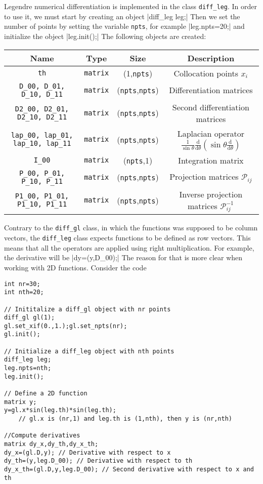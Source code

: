\medskip

Legendre numerical differentiation is implemented in the class \texttt{diff\_leg}. In order to use
it, we must start by creating an object
|diff_leg leg;|
Then we set the number of points by setting the variable \texttt{npts}, for example
|leg.npts=20;|
and initialize the object
|leg.init();|
The following objects are created:

\medskip
\begin{tabular}{cccc}
Name&Type&Size&Description\\
\hline
\texttt{th}&\texttt{matrix}&(1,\texttt{npts})& Collocation points $x_i$\\
\texttt{D\_00, D\_01, D\_10, D\_11}&\texttt{matrix}&
(\texttt{npts},\texttt{npts})&Differentiation matrices\\
\texttt{D2\_00, D2\_01, D2\_10, D2\_11}&\texttt{matrix}&
(\texttt{npts},\texttt{npts})&Second differentiation matrices\\
\texttt{lap\_00, lap\_01, lap\_10, lap\_11}&\texttt{matrix}&
(\texttt{npts},\texttt{npts})&Laplacian operator
$\frac{1}{\sin\theta}\frac{\mathrm{d}}{\mathrm{d}\theta}\left(\sin\theta\frac{\mathrm{d}}{\mathrm{d}\theta}\right)$\\
\texttt{I\_00}&\texttt{matrix}&(\texttt{npts},1)&Integration matrix\\
\texttt{P\_00, P\_01, P\_10, P\_11}&\texttt{matrix}&
(\texttt{npts},\texttt{npts})&Projection matrices $\mathcal{P}_{ij}$\\
\texttt{P1\_00, P1\_01, P1\_10, P1\_11}&\texttt{matrix}&
(\texttt{npts},\texttt{npts})&Inverse projection matrices $\mathcal{P}^{-1}_{ij}$\\
\end{tabular}
\medskip

Contrary to the \texttt{diff\_gl} class, in which the functions was supposed to be column vectors,
the \texttt{diff\_leg} class expects functions to be defined as row vectors. This means that
all the operators are applied using right multiplication. For example, the derivative will be
|dy=(y,D_00);|
The reason for that is more clear when working with 2D functions. Consider the code
\begin{verbatim}
int nr=30;
int nth=20;

// Inititalize a diff_gl object with nr points
diff_gl gl(1);
gl.set_xif(0.,1.);gl.set_npts(nr);
gl.init();

// Initialize a diff_leg object with nth points
diff_leg leg;
leg.npts=nth;
leg.init();

// Define a 2D function 
matrix y;
y=gl.x*sin(leg.th)*sin(leg.th);
	// gl.x is (nr,1) and leg.th is (1,nth), then y is (nr,nth)

//Compute derivatives
matrix dy_x,dy_th,dy_x_th;
dy_x=(gl.D,y); // Derivative with respect to x
dy_th=(y,leg.D_00); // Derivative with respect to th
dy_x_th=(gl.D,y,leg.D_00); // Second derivative with respect to x and th

\end{verbatim}

